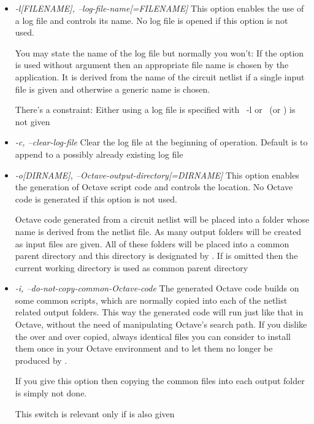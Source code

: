 \begin{itemize}
  \item \emph{-l[FILENAME], --log-file-name[=FILENAME]}
    This option enables the use of a log file and controls its name. No
    log file is opened if this option is not used.
    
    You may state the name of the log file but normally you won't: If the
    option is used without argument  then an appropriate
    file name is chosen by the application. It is derived from the name of
    the circuit netlist if a single input file is given and otherwise a
    generic name is chosen.
    
    There's a constraint: Either using a log file is specified with
    \code~{-l} or~ (or ) is not given 
    
  \item \emph{-c, --clear-log-file}
    Clear the log file at the beginning of operation. Default is to append
    to a possibly already existing log file
    
  \item \emph{-o[DIRNAME], --Octave-output-directory[=DIRNAME]}
    This option enables the generation of Octave script code and controls
    the location. No Octave code is generated if this option is not used.

    Octave code generated from a circuit netlist will be placed into a
    folder whose name is derived from the netlist file. As many output
    folders will be created as input files are given. All of these folders
    will be placed into a common parent directory and this directory is
    designated by . If  is omitted then the
    current working directory is used as common parent directory

  \item \emph{-i, --do-not-copy-common-Octave-code}
    The generated Octave code builds on some common scripts, which are
    normally copied into each of the netlist related output folders. This
    way the generated code will run just like that in Octave, without the
    need of manipulating Octave's search path. If you dislike the over and
    over copied, always identical files you can consider to install them
    once in your Octave environment and to let them no longer be produced
    by \linnet{}.
    
    If you give this option then copying the common files into each output
    folder is simply not done.
    
    This switch is relevant only if  is also given

\end{itemize}

